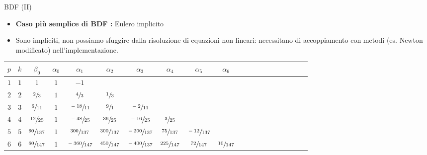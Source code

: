 \documentclass[aspectratio=169, 10pt, handout,usenames,dvipsnames]{beamer}
\begin{document}
    \begin{frame}{BDF (II)}
        \begin{itemize}
            \item \textbf{Caso più semplice di BDF :} Eulero implicito
            \item Sono impliciti, non possiamo sfuggire dalla risoluzione di equazioni non lineari: necessitano di accoppiamento con metodi (es. Newton modificato) nell’implementazione.
        \end{itemize}
        
        \begin{table}[]
            \begin{tabular}{Sc|Sc|Sc|ScScScScScScSc}
            \( p \) & \(k\) & \(\beta_0\) & \(\alpha_0\) & \(\alpha_1\) & \(\alpha_2\)  & \(\alpha_3\) & \(\alpha_4\) & \(\alpha_5\) & \(\alpha_6\) \\
            \hline
            \(1\) & \(1\) & \(1 \)       & \(1 \) & \(-1\)       &                             &          &         &         &        \\
            \(2\) & \(2\) & \(\sfrac{2}{3} \)    & \(1\) & \(\sfrac{4}{3} \)     & \(\sfrac{1}{3} \)                         &          &         &         &        \\
            \(3\) & \(3\) & \(\sfrac{6}{11} \)   & \(1\) & \(\sfrac{-18}{11} \)   & \(\sfrac{9}{1} \)                       & \(\sfrac{-2}{11}\)    &         &         &        \\
            \(4\) & \(4\) & \(\sfrac{12}{25} \)  & \(1\) & \(\sfrac{-48}{25} \)   & \(\sfrac{36}{25} \)   & \(\sfrac{-16}{25}\)   & \(\sfrac{3}{25}\)   &         &        \\
            \(5\) & \(5\) & \(\sfrac{60}{137} \) & \(1\) & \(\sfrac{300}{137} \)  & \(\sfrac{300}{137}\) & \(\sfrac{-200}{137}\) & \(\sfrac{75}{137}\)  & \(\sfrac{-12}{137}\) &        \\
            \(6\) & \(6\) & \(\sfrac{60}{147} \) & \(1\) & \(\sfrac{-360}{147} \) & \(\sfrac{450}{147}\) & \(\sfrac{-400}{137}\) & \(\sfrac{225}{147}\) & \(\sfrac{72}{147}\) & \(\sfrac{10}{147}\)
            \end{tabular}
        \end{table}
        

        
        
    \end{frame}
\end{document}
